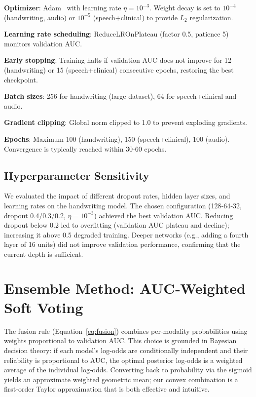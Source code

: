 \documentclass[conference]{IEEEtran}
\begin{document}
\textbf{Optimizer}: Adam~\cite{kingma2015adam} with learning rate $\eta=10^{-3}$. Weight decay is set to $10^{-4}$ (handwriting, audio) or $10^{-5}$ (speech+clinical) to provide $L_2$ regularization.

\textbf{Learning rate scheduling}: ReduceLROnPlateau (factor 0.5, patience 5) monitors validation AUC.

\textbf{Early stopping}: Training halts if validation AUC does not improve for 12 (handwriting) or 15 (speech+clinical) consecutive epochs, restoring the best checkpoint.

\textbf{Batch sizes}: 256 for handwriting (large dataset), 64 for speech+clinical and audio.

\textbf{Gradient clipping}: Global norm clipped to 1.0 to prevent exploding gradients.

\textbf{Epochs}: Maximum 100 (handwriting), 150 (speech+clinical), 100 (audio). Convergence is typically reached within 30‑60 epochs.

\subsection{Hyperparameter Sensitivity}
We evaluated the impact of different dropout rates, hidden layer sizes, and learning rates on the handwriting model. The chosen configuration (128‑64‑32, dropout 0.4/0.3/0.2, $\eta=10^{-3}$) achieved the best validation AUC. Reducing dropout below 0.2 led to overfitting (validation AUC plateau and decline); increasing it above 0.5 degraded training. Deeper networks (e.g., adding a fourth layer of 16 units) did not improve validation performance, confirming that the current depth is sufficient.

\section{Ensemble Method: AUC‑Weighted Soft Voting}
The fusion rule (Equation~\ref{eq:fusion}) combines per‑modality probabilities using weights proportional to validation AUC. This choice is grounded in Bayesian decision theory: if each model's log‑odds are conditionally independent and their reliability is proportional to AUC, the optimal posterior log‑odds is a weighted average of the individual log‑odds. Converting back to probability via the sigmoid yields an approximate weighted geometric mean; our convex combination is a first‑order Taylor approximation that is both effective and intuitive.
\end{document}

